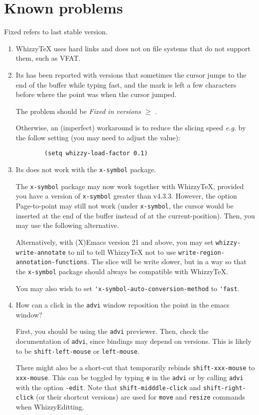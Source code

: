 \documentclass{article}
\def \WhizzyTeX{Whizzy\TeX}
\let \lst \verb
\begin{document}
\section {Known problems}

Fixed refers to last stable version.
\def \FIXED {\textit{Fixed in versions $\ge$ {\version}}}

\begin {enumerate}

\item
{\WhizzyTeX} uses hard links and does not on file systems that do not
support them, such as VFAT. 

\item
Its has been reported with versions that sometimes the cursor jumps to the
end of the buffer while typing fast, and the mark is left a few characters
before where the point was when the cursor jumped.

The problem should be \FIXED. 

Otherwise, an (imperfect) workaround is to reduce the slicing speed
\emph{e.g.}  by the follow setting (you may need to adjust the value):
\begin{verbatim}
        (setq whizzy-load-factor 0.1)
\end{verbatim}


\item Its does not work with the  \lst"x-symbol" package.

The \lst"x-symbol" package may now work together with {\WhizzyTeX}, provided
you have a version of {\tt x-symbol} greater than v4.3.3.  However, the
option Page-to-point may still not work (under \lst"x-symbol", the cursor
would be inserted at the end of the buffer instead of at the
current-position).  Then, you may use the following alternative.

Alternatively, with (X)Emacs version 21 and above, you may set
\lst"whizzy-write-annotate" to nil to tell {\WhizzyTeX} not to use
\lst"write-region-annotation-functions". The slice will be write slower, but
in a way so that the \lst"x-symbol" package should always be compatible with 
{\WhizzyTeX}. 

You may also wish to set \lst"'x-symbol-auto-conversion-method" to
\lst"'fast".

\item How can a click in the \lst"advi" window reposition the point
in the emacs window?

First, you should be using the \lst"advi" previewer.  Then, check the
documentation of \lst"advi", since bindings may depend on versions. This is
likely to be \lst"shift-left-mouse" or \lst"left-mouse".

There might also be a short-cut that temporarily rebinds
\lst"shift-xxx-mouse" to \lst"xxx-mouse". This can be toggled by typing
\lst"e"   in the \lst"advi" or by calling \lst"advi" with the option
\lst"-edit". 
%
Note that \lst"shift-midddle-click" and \lst"shift-right-click" (or their
shortcut versions) are used for \lst"move" and \lst"resize" commands when
WhizzyEditting.


\end {enumerate}
\end{document}
